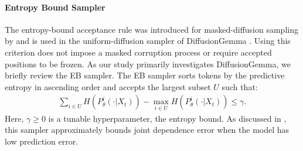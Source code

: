 \paragraph{Entropy Bound Sampler}
The entropy-bound acceptance rule was introduced for masked-diffusion sampling by \citet{ben2026accelerated} and is used in the uniform-diffusion sampler of DiffusionGemma \citep{team2026diffusiongemma}. Using this criterion does not impose a masked corruption process or require accepted positions to be frozen.
As our study primarily investigates DiffusionGemma, we briefly review the EB sampler.
The EB sampler sorts tokens by the predictive entropy in ascending order and accepts the largest subset $U$ such that:
\begin{align}
    \label{eq:eb-bound}
    \sum_{i \in U} H(P_{\theta}^i(\cdot | X_t)) - \max_{i \in U}  H(P_{\theta}^i(\cdot | X_t)) \le \gamma.
\end{align}
Here, $\gamma \ge 0$ is a tunable hyperparameter, the entropy bound. As discussed in \citet{ben2026accelerated}, this sampler approximately bounds joint dependence error when the model has low prediction error.
